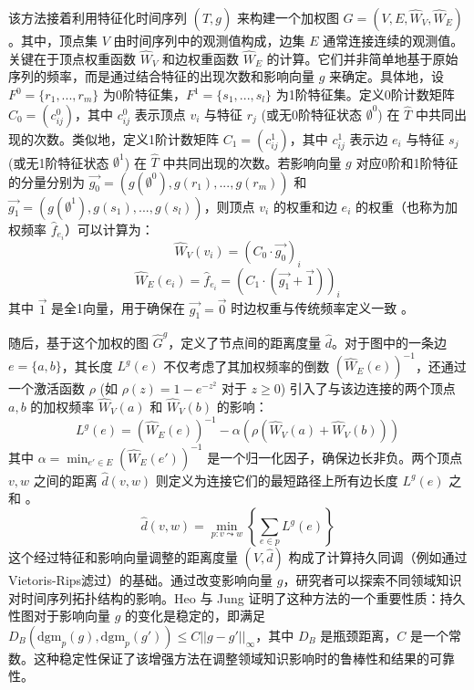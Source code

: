 该方法接着利用特征化时间序列 $(\hat{T}, g)$ 来构建一个加权图 $G=(V,E,\hat{W}_V,\hat{W}_E)$。其中，顶点集 $V$ 由时间序列中的观测值构成，边集 $E$ 通常连接连续的观测值。关键在于顶点权重函数 $\hat{W}_V$ 和边权重函数 $\hat{W}_E$ 的计算。它们并非简单地基于原始序列的频率，而是通过结合特征的出现次数和影响向量 $g$ 来确定。具体地，设 $F^0 = \{r_1, ..., r_m\}$ 为0阶特征集，$F^1 = \{s_1, ..., s_l\}$ 为1阶特征集。定义0阶计数矩阵 $C_0=(c_{ij}^0)$，其中 $c_{ij}^0$ 表示顶点 $v_i$ 与特征 $r_j$ (或无0阶特征状态 $\emptyset^0$) 在 $\hat{T}$ 中共同出现的次数。类似地，定义1阶计数矩阵 $C_1=(c_{ij}^1)$，其中 $c_{ij}^1$ 表示边 $e_i$ 与特征 $s_j$ (或无1阶特征状态 $\emptyset^1$) 在 $\hat{T}$ 中共同出现的次数。若影响向量 $g$ 对应0阶和1阶特征的分量分别为 $\vec{g_0} = (g(\emptyset^0), g(r_1), ..., g(r_m))$ 和 $\vec{g_1} = (g(\emptyset^1), g(s_1), ..., g(s_l))$，则顶点 $v_i$ 的权重和边 $e_i$ 的权重（也称为加权频率 $\hat{f}_{e_i}$）可以计算为：
\begin{equation}
    \hat{W}_V(v_i) = (C_0 \cdot \vec{g_0})_i
\end{equation}
\begin{equation}
    \hat{W}_E(e_i) = \hat{f}_{e_i} = (C_1 \cdot (\vec{g_1} + \vec{1}))_i
\end{equation}
其中 $\vec{1}$ 是全1向量，用于确保在 $\vec{g_1}=\vec{0}$ 时边权重与传统频率定义一致 。

随后，基于这个加权的图 $\hat{G}^g$，定义了节点间的距离度量 $\hat{d}$。对于图中的一条边 $e=\{a,b\}$，其长度 $L^g(e)$ 不仅考虑了其加权频率的倒数 $(\hat{W}_E(e))^{-1}$，还通过一个激活函数 $\rho$ (如 $\rho(z)=1-e^{-z^2}$ 对于 $z \ge 0$) 引入了与该边连接的两个顶点 $a,b$ 的加权频率 $\hat{W}_V(a)$ 和 $\hat{W}_V(b)$ 的影响：
\begin{equation}
    L^g(e) = (\hat{W}_E(e))^{-1} - \alpha (\rho(\hat{W}_V(a) + \hat{W}_V(b)))
\end{equation}
其中 $\alpha = \min_{e' \in E} (\hat{W}_E(e'))^{-1}$ 是一个归一化因子，确保边长非负。两个顶点 $v,w$ 之间的距离 $\hat{d}(v,w)$ 则定义为连接它们的最短路径上所有边长度 $L^g(e)$ 之和 。
\begin{equation}
    \hat{d}(v,w) = \min_{p: v \leadsto w} \left\{ \sum_{e \in p} L^g(e) \right\}
\end{equation}
这个经过特征和影响向量调整的距离度量 $(V, \hat{d})$ 构成了计算持久同调（例如通过Vietoris-Rips滤过）的基础。通过改变影响向量 $g$，研究者可以探索不同领域知识对时间序列拓扑结构的影响。Heo 与 Jung 证明了这种方法的一个重要性质：持久性图对于影响向量 $g$ 的变化是稳定的，即满足 $D_B(\text{dgm}_p(g), \text{dgm}_p(g')) \le C ||g-g'||_\infty$，其中 $D_B$ 是瓶颈距离，$C$ 是一个常数。这种稳定性保证了该增强方法在调整领域知识影响时的鲁棒性和结果的可靠性。

